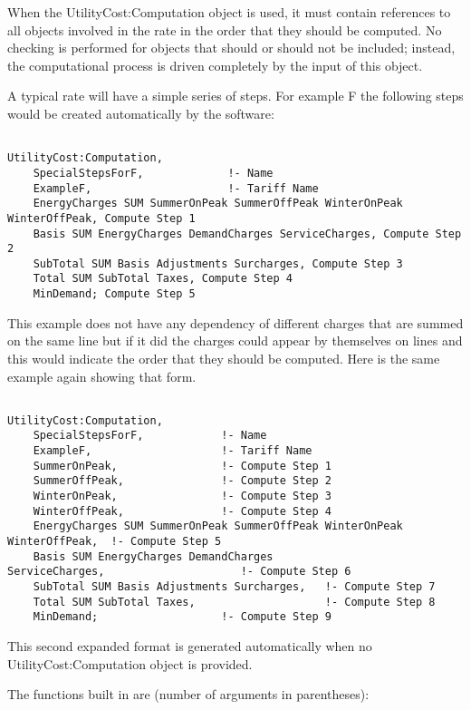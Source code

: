 When the UtilityCost:Computation object is used, it must contain references to all objects involved in the rate in the order that they should be computed. No checking is performed for objects that should or should not be included; instead, the computational process is driven completely by the input of this object.

A typical rate will have a simple series of steps. For example F the following steps would be created automatically by the software:

\begin{lstlisting}

UtilityCost:Computation,
    SpecialStepsForF,             !- Name
    ExampleF,                     !- Tariff Name
    EnergyCharges SUM SummerOnPeak SummerOffPeak WinterOnPeak WinterOffPeak, Compute Step 1
    Basis SUM EnergyCharges DemandCharges ServiceCharges, Compute Step 2
    SubTotal SUM Basis Adjustments Surcharges, Compute Step 3
    Total SUM SubTotal Taxes, Compute Step 4
    MinDemand; Compute Step 5
\end{lstlisting}

This example does not have any dependency of different charges that are summed on the same line but if it did the charges could appear by themselves on lines and this would indicate the order that they should be computed. Here is the same example again showing that form.

\begin{lstlisting}

UtilityCost:Computation,
    SpecialStepsForF,            !- Name
    ExampleF,                    !- Tariff Name
    SummerOnPeak,                !- Compute Step 1
    SummerOffPeak,               !- Compute Step 2
    WinterOnPeak,                !- Compute Step 3
    WinterOffPeak,               !- Compute Step 4
    EnergyCharges SUM SummerOnPeak SummerOffPeak WinterOnPeak WinterOffPeak,  !- Compute Step 5
    Basis SUM EnergyCharges DemandCharges ServiceCharges,                     !- Compute Step 6
    SubTotal SUM Basis Adjustments Surcharges,   !- Compute Step 7
    Total SUM SubTotal Taxes,                    !- Compute Step 8
    MinDemand;                   !- Compute Step 9
\end{lstlisting}

This second expanded format is generated automatically when no UtilityCost:Computation object is provided.

The functions built in are (number of arguments in parentheses):


